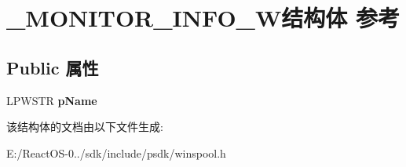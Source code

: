 \hypertarget{struct___m_o_n_i_t_o_r___i_n_f_o__1_w}{}\section{\+\_\+\+M\+O\+N\+I\+T\+O\+R\+\_\+\+I\+N\+F\+O\+\_\+W结构体 参考}
\label{struct___m_o_n_i_t_o_r___i_n_f_o__1_w}
\subsection*{Public 属性}
\begin{DoxyCompactItemize}
\item 
\mbox{\label{struct___m_o_n_i_t_o_r___i_n_f_o__1_w_a916c9aaf947de0b29230a95e79145b9c}} 
L\+P\+W\+S\+TR {\bfseries p\+Name}
\end{DoxyCompactItemize}


该结构体的文档由以下文件生成\+:\begin{DoxyCompactItemize}
\item 
E\+:/\+React\+O\+S-\/0../sdk/include/psdk/winspool.\+h\end{DoxyCompactItemize}
